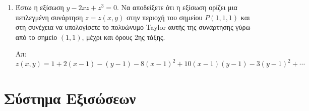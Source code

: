 \begin{enumerate}
    \item Έστω η εξίσωση $ y - 2xz + z^{3} = 0 $. Να αποδείξετε ότι η εξίσωση 
        ορίζει μια πεπλεγμένη συνάρτηση $ z = z(x,y) $ στην περιοχή του σημείου 
        $ P(1,1,1) $ και στη συνέχεια να υπολογίσετε το πολυώνυμο Taylor αυτής 
        της συνάρτησης γύρω από το σημείο $ (1,1) $, μέχρι και όρους 2ης τάξης. 

        \hfill Απ: $ z(x,y) =  1 + 2(x-1) - (y-1) - 8(x-1)^{2} + 10(x-1)(y-1) - 
        3(y-1)^{2} + \cdots $ 

\end{enumerate}


\section{Σύστημα Εξισώσεων}

